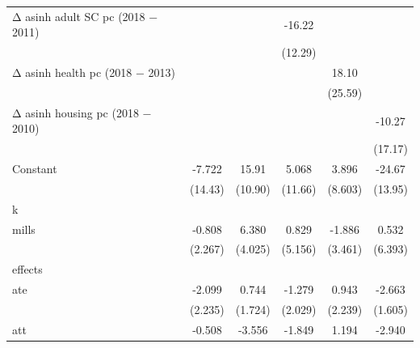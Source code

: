 \begin{table}[htbp]
\begin{tabular}{l*{5}{c}}
\addlinespace
Δ asinh adult SC pc (2018 − 2011)&                     &                     &      -16.22         &                     &                     \\
                    &                     &                     &     (12.29)         &                     &                     \\
\addlinespace
Δ asinh health pc (2018 − 2013)&                     &                     &                     &       18.10         &                     \\
                    &                     &                     &                     &     (25.59)         &                     \\
\addlinespace
Δ asinh housing pc (2018 − 2010)&                     &                     &                     &                     &      -10.27         \\
                    &                     &                     &                     &                     &     (17.17)         \\
\addlinespace
Constant            &      -7.722         &       15.91         &       5.068         &       3.896         &      -24.67\sym{*}  \\
                    &     (14.43)         &     (10.90)         &     (11.66)         &     (8.603)         &     (13.95)         \\
\midrule
k                   &                     &                     &                     &                     &                     \\
mills               &      -0.808         &       6.380         &       0.829         &      -1.886         &       0.532         \\
                    &     (2.267)         &     (4.025)         &     (5.156)         &     (3.461)         &     (6.393)         \\
\midrule
effects             &                     &                     &                     &                     &                     \\
ate                 &      -2.099         &       0.744         &      -1.279         &       0.943         &      -2.663\sym{*}  \\
                    &     (2.235)         &     (1.724)         &     (2.029)         &     (2.239)         &     (1.605)         \\
\addlinespace
att                 &      -0.508         &      -3.556         &      -1.849         &       1.194         &      -2.940         \\

\end{tabular}
\end{table}
